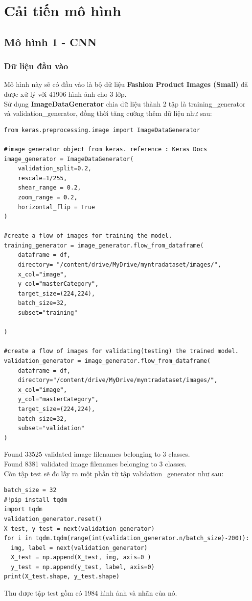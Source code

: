 \section{Cải tiến mô hình}
\subsection{Mô hình 1 - CNN}
\subsubsection{Dữ liệu đầu vào }
Mô hình này sẽ có đầu vào là bộ dữ liệu \textbf{Fashion Product Images (Small)} đã được xử lý với 41906 hình ảnh cho 3 lớp.\\

Sử dụng \textbf{ImageDataGenerator} chia dữ liệu thành 2 tập là training\_generator và validation\_generator, đồng thời tăng cường thêm dữ liệu như sau:
\begin{lstlisting}
from keras.preprocessing.image import ImageDataGenerator

#image generator object from keras. reference : Keras Docs
image_generator = ImageDataGenerator(
    validation_split=0.2, 
    rescale=1/255, 
    shear_range = 0.2, 
    zoom_range = 0.2, 
    horizontal_flip = True
)

#create a flow of images for training the model.
training_generator = image_generator.flow_from_dataframe(
    dataframe = df,
    directory= "/content/drive/MyDrive/myntradataset/images/",
    x_col="image",
    y_col="masterCategory",
    target_size=(224,224),
    batch_size=32,
    subset="training"

)

#create a flow of images for validating(testing) the trained model.
validation_generator = image_generator.flow_from_dataframe(
    dataframe = df,
    directory="/content/drive/MyDrive/myntradataset/images/",
    x_col="image",
    y_col="masterCategory",
    target_size=(224,224),
    batch_size=32,
    subset="validation"
)
\end{lstlisting}
Found 33525 validated image filenames belonging to 3 classes.\\
Found 8381 validated image filenames belonging to 3 classes.\\

\newpage
Còn tập test sẽ đc lấy ra một phần từ tập validation\_generator như sau:
\begin{lstlisting}
batch_size = 32
#!pip install tqdm
import tqdm
validation_generator.reset()
X_test, y_test = next(validation_generator)
for i in tqdm.tqdm(range(int(validation_generator.n/batch_size)-200)): 
  img, label = next(validation_generator)
  X_test = np.append(X_test, img, axis=0 )
  y_test = np.append(y_test, label, axis=0)
print(X_test.shape, y_test.shape)
\end{lstlisting}
Thu được tập test gồm có 1984 hình ảnh và nhãn của nó.

